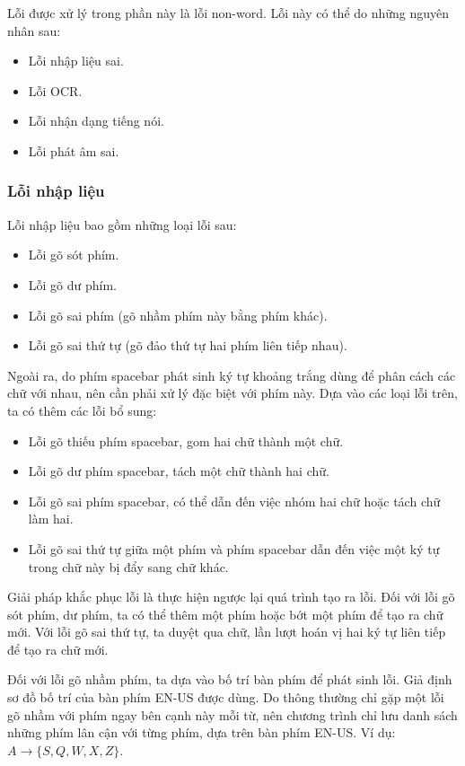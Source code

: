\documentclass[a4paper,oneside,14pt]{extbook} %
\begin{document}
Lỗi được xử lý trong phần này là lỗi non-word. Lỗi này có thể do những
nguyên nhân sau:
\begin{itemize}
\item Lỗi nhập liệu sai.
\item Lỗi OCR.
\item Lỗi nhận dạng tiếng nói.
\item Lỗi phát âm sai.
\end{itemize}


\subsubsection{Lỗi nhập liệu}
\label{sec:nonword:recover:keyboard}

Lỗi nhập liệu bao gồm những loại lỗi sau:
\begin{itemize}
\item Lỗi gõ sót phím.
\item Lỗi gõ dư phím.
\item Lỗi gõ sai phím (gõ nhầm phím này bằng phím khác).
\item Lỗi gõ sai thứ tự (gõ đảo thứ tự hai phím liên tiếp nhau).
\end{itemize}

Ngoài ra, do phím spacebar phát sinh ký tự khoảng trắng dùng để phân
cách các chữ với nhau, nên cần phải xử lý đặc biệt với phím này. Dựa
vào các loại lỗi trên, ta có thêm các lỗi bổ sung:
\begin{itemize}
\item Lỗi gõ thiếu phím spacebar, gom hai chữ thành một chữ.
\item Lỗi gõ dư phím spacebar, tách một chữ thành hai chữ.
\item Lỗi gõ sai phím spacebar, có thể dẫn đến việc nhóm hai chữ hoặc
  tách chữ làm hai.
\item Lỗi gõ sai thứ tự giữa một phím và phím spacebar dẫn đến việc
  một ký tự trong chữ này bị đẩy sang chữ khác.
\end{itemize}

Giải pháp khắc phục lỗi là thực hiện ngược lại quá trình tạo ra
lỗi. Đối với lỗi gõ sót phím, dư phím, ta có thể thêm một phím hoặc
bớt một phím để tạo ra chữ mới. Với lỗi gõ sai thứ tự, ta duyệt qua
chữ, lần lượt hoán vị hai ký tự liên tiếp để tạo ra chữ mới.

Đối với lỗi gõ nhầm phím, ta dựa vào bố trí bàn phím để phát sinh
lỗi. Giả định sơ đồ bố trí của bàn phím EN-US được dùng. Do thông
thường chỉ gặp một lỗi gõ nhầm với phím ngay bên cạnh này mỗi 
từ, nên chương trình chỉ lưu danh  sách những phím lân cận với từng
phím, dựa trên bàn phím EN-US. Ví dụ: $A \rightarrow \{ S, Q, W, X, Z \}$. 
\end{document}
